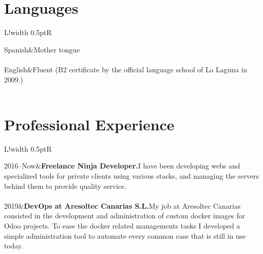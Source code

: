 \documentclass[10pt]{article}
\newcommand\VRule{\color{lightgray}\vrule width 0.5pt}
\begin{document}
    \section*{Languages}
    \begin{tabular}{L!{\VRule}R}

        Spanish&Mother tongue\\\\

        English&Fluent (B2 certificate by the official language school of La Laguna in 2009.)\\\\

    \end{tabular}

    \section*{Professional Experience}
    \begin{tabular}{L!{\VRule}R}

        2016--Now&{{\bf Freelance Ninja Developer.}\newline I have been developing webs and specialized tools for private clients using various stacks, and managing the servers behind them to provide quality service.}\\\\

        2019&{{\bf DevOps at Aresoltec Canarias S.L.}\newline My job at Aresoltec Canarias consisted in the development and administration of custom docker images for Odoo projects. To ease the docker related managements tasks I developed a simple administration tool to automate every common case that is still in use today.}\\\\

    \end{tabular}
\end{document}
